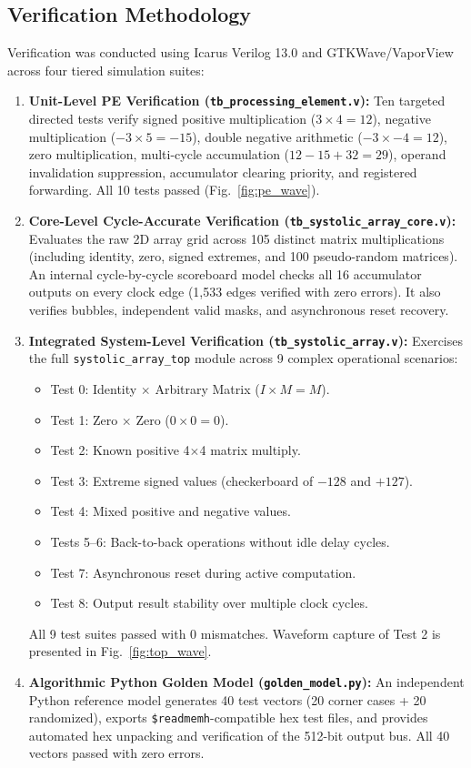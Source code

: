 \documentclass[conference]{IEEEtran}
\begin{document}
\subsection{Verification Methodology}
Verification was conducted using Icarus Verilog 13.0 and GTKWave/VaporView across four tiered simulation suites:
\begin{enumerate}
    \item \textbf{Unit-Level PE Verification (\texttt{tb\_processing\_element.v}):} Ten targeted directed tests verify signed positive multiplication ($3 \times 4 = 12$), negative multiplication ($-3 \times 5 = -15$), double negative arithmetic ($-3 \times -4 = 12$), zero multiplication, multi-cycle accumulation ($12 - 15 + 32 = 29$), operand invalidation suppression, accumulator clearing priority, and registered forwarding. All 10 tests passed (Fig.~\ref{fig:pe_wave}).
    \item \textbf{Core-Level Cycle-Accurate Verification (\texttt{tb\_systolic\_array\_core.v}):} Evaluates the raw 2D array grid across 105 distinct matrix multiplications (including identity, zero, signed extremes, and 100 pseudo-random matrices). An internal cycle-by-cycle scoreboard model checks all 16 accumulator outputs on every clock edge (1,533 edges verified with zero errors). It also verifies bubbles, independent valid masks, and asynchronous reset recovery.
    \item \textbf{Integrated System-Level Verification (\texttt{tb\_systolic\_array.v}):} Exercises the full \texttt{systolic\_array\_top} module across 9 complex operational scenarios:
    \begin{itemize}
        \item Test 0: Identity $\times$ Arbitrary Matrix ($I \times M = M$).
        \item Test 1: Zero $\times$ Zero ($0 \times 0 = 0$).
        \item Test 2: Known positive 4$\times$4 matrix multiply.
        \item Test 3: Extreme signed values (checkerboard of $-128$ and $+127$).
        \item Test 4: Mixed positive and negative values.
        \item Tests 5--6: Back-to-back operations without idle delay cycles.
        \item Test 7: Asynchronous reset during active computation.
        \item Test 8: Output result stability over multiple clock cycles.
    \end{itemize}
    All 9 test suites passed with 0 mismatches. Waveform capture of Test 2 is presented in Fig.~\ref{fig:top_wave}.
    \item \textbf{Algorithmic Python Golden Model (\texttt{golden\_model.py}):} An independent Python reference model generates 40 test vectors (20 corner cases + 20 randomized), exports \texttt{\$readmemh}-compatible hex test files, and provides automated hex unpacking and verification of the 512-bit output bus. All 40 vectors passed with zero errors.
\end{enumerate}
\end{document}
